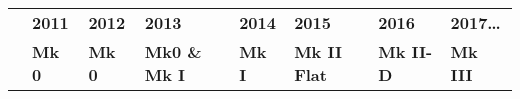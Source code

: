 \footnotesize{
    \begin{tabular}[h]{p{}p{}p{}p{}p{}p{}p{}p{}}
        & \bf \textcolor{LMBlue}{2011} & \bf \textcolor{LMBlue}{2012} & \bf \textcolor{LMBlue}{2013} & \bf \textcolor{LMBlue}{2014} & \bf \textcolor{LMBlue}{2015} & \bf \textcolor{LMBlue}{2016} & \bf \textcolor{LMBlue}{2017\ldots} \\
        & \bf \textcolor{LMBlue}{Mk 0} & \bf \textcolor{LMBlue}{Mk 0} & \bf \textcolor{LMBlue}{Mk0 \& Mk I} & \bf \textcolor{LMBlue}{Mk I} & \bf \textcolor{LMBlue}{Mk II Flat} & \bf \textcolor{LMBlue}{Mk II-D} & \bf \textcolor{LMBlue}{Mk III} \\
    \end{tabular}
}

